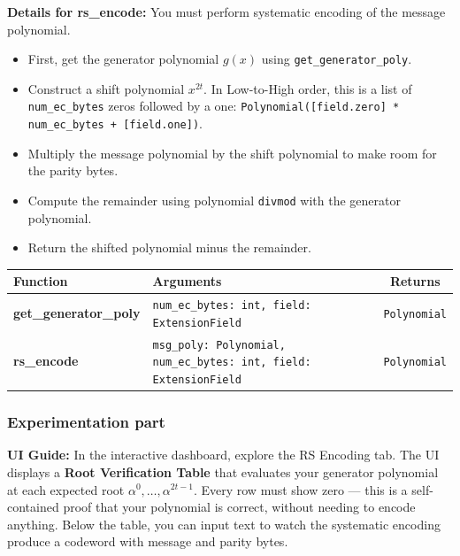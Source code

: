 \textbf{Details for rs\_encode:}
You must perform systematic encoding of the message polynomial.
\begin{itemize}
    \item First, get the generator polynomial $g(x)$ using \lstinline|get_generator_poly|.
    \item Construct a shift polynomial $x^{2t}$. In Low-to-High order, this is a list of \lstinline|num_ec_bytes| zeros followed by a one: \lstinline|Polynomial([field.zero] * num_ec_bytes + [field.one])|.
    \item Multiply the message polynomial by the shift polynomial to make room for the parity bytes.
    \item Compute the remainder using polynomial \lstinline|divmod| with the generator polynomial.
    \item Return the shifted polynomial minus the remainder.
\end{itemize}

\begin{center}
\renewcommand{\arraystretch}{1.5}
\begin{tabularx}{\textwidth}{@{} >{\bfseries}l X c @{}}
\toprule
Function & Arguments & Returns \\ \midrule
get\_generator\_poly & \lstinline|num_ec_bytes: int, field: ExtensionField| & \lstinline|Polynomial| \\
rs\_encode & \lstinline|msg_poly: Polynomial, num_ec_bytes: int, field: ExtensionField| & \lstinline|Polynomial| \\
\bottomrule
\end{tabularx}
\end{center}

\subsubsection*{Experimentation part}
\textbf{UI Guide:} In the interactive dashboard, explore the RS Encoding tab. The UI displays a \textbf{Root Verification Table} that evaluates your generator polynomial at each expected root $\alpha^0, \ldots, \alpha^{2t-1}$. Every row must show zero --- this is a self-contained proof that your polynomial is correct, without needing to encode anything. Below the table, you can input text to watch the systematic encoding produce a codeword with message and parity bytes.

\vspace{1cm}

